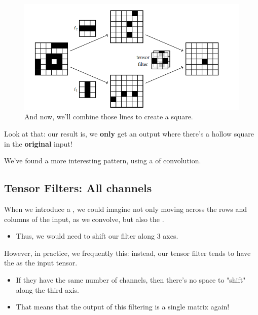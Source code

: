         \begin{figure}[ht]
            \centering
            \includegraphics[width=.7\linewidth]{images/convolutional_neural_networks_images/two_layer_conv.png}
            \caption*{And now, we'll combine those lines to create a square.}
        \end{figure}

        Look at that: our result is, we \textbf{only} get an output where there's a hollow square in the \textbf{original} input!

        We've found a more interesting pattern, using a  of convolution.

    \subsection{Tensor Filters: All channels}

        When we introduce a , we could imagine not only moving across the rows and columns of the input, as we convolve, but also the .

        \begin{itemize}
            \item Thus, we would need to shift our filter along 3 axes.
        \end{itemize}

        However, in practice, we frequently  this: instead, our tensor filter tends to have the  as the input tensor.

        \begin{itemize}
            \item If they have the same number of channels, then there's no space to "shift" along the third axis.
            \item That means that the output of this filtering is a single matrix again!
                \\
        \end{itemize}

